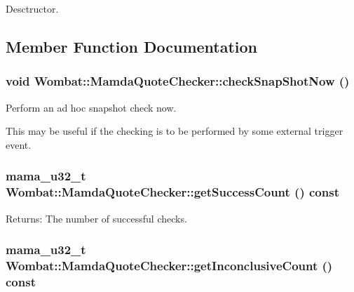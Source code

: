 Desctructor. 



\subsection{Member Function Documentation}
\hypertarget{classWombat_1_1MamdaQuoteChecker_84e1ea28c2c97eac58859c06b9c65190}{
\subsubsection[checkSnapShotNow]{\setlength{\rightskip}{0pt plus 5cm}void Wombat::Mamda\-Quote\-Checker::check\-Snap\-Shot\-Now ()}}
\label{classWombat_1_1MamdaQuoteChecker_84e1ea28c2c97eac58859c06b9c65190}


Perform an ad hoc snapshot check now. 

This may be useful if the checking is to be performed by some external trigger event. \hypertarget{classWombat_1_1MamdaQuoteChecker_1b7d7013d73ff3162c2ec7c5f764c656}{
\subsubsection[getSuccessCount]{\setlength{\rightskip}{0pt plus 5cm}mama\_\-u32\_\-t Wombat::Mamda\-Quote\-Checker::get\-Success\-Count () const}}
\label{classWombat_1_1MamdaQuoteChecker_1b7d7013d73ff3162c2ec7c5f764c656}


\begin{Desc}
\item[Returns:]The number of successful checks. \end{Desc}
\hypertarget{classWombat_1_1MamdaQuoteChecker_49868058145c3fcaea3c5cb32294bd62}{
\subsubsection[getInconclusiveCount]{\setlength{\rightskip}{0pt plus 5cm}mama\_\-u32\_\-t Wombat::Mamda\-Quote\-Checker::get\-Inconclusive\-Count () const}}
\label{classWombat_1_1MamdaQuoteChecker_49868058145c3fcaea3c5cb32294bd62}


